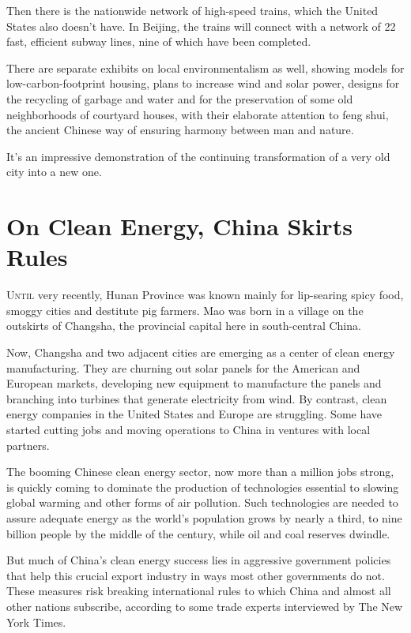 ﻿\documentclass[12pt]{article}
\begin{document}
Then there is the nationwide network of high-speed trains, which the United States also doesn't
have. In Beijing, the trains will connect with a network of 22 fast, efficient subway lines, nine of
which have been completed.

There are separate exhibits on local environmentalism as well, showing models for
low-carbon-footprint housing, plans to increase wind and solar power, designs for the recycling of
garbage and water and for the preservation of some old neighborhoods of courtyard houses, with their
elaborate attention to feng shui, the ancient Chinese way of ensuring harmony between man and
nature.

It's an impressive demonstration of the continuing transformation of a very old city into a new one.

\pagebreak
\section{On Clean Energy, China Skirts Rules}

\lettrine{U}{ntil} very recently, Hunan Province was known mainly for
lip-searing spicy food, smoggy cities and destitute pig farmers. Mao was born in a village on the
outskirts of Changsha, the provincial capital here in south-central China.

Now, Changsha and two adjacent cities are emerging as a center of clean energy manufacturing. They
are churning out solar panels for the American and European markets, developing new equipment to
manufacture the panels and branching into turbines that generate electricity from wind. By contrast,
clean energy companies in the United States and Europe are struggling. Some have started cutting
jobs and moving operations to China in ventures with local partners.

The booming Chinese clean energy sector, now more than a million jobs strong, is quickly coming to
dominate the production of technologies essential to slowing global warming and other forms of air
pollution. Such technologies are needed to assure adequate energy as the world's population grows by
nearly a third, to nine billion people by the middle of the century, while oil and coal reserves
dwindle.

But much of China's clean energy success lies in aggressive government policies that help this
crucial export industry in ways most other governments do not. These measures risk breaking
international rules to which China and almost all other nations subscribe, according to some trade
experts interviewed by The New York Times.
\end{document}
